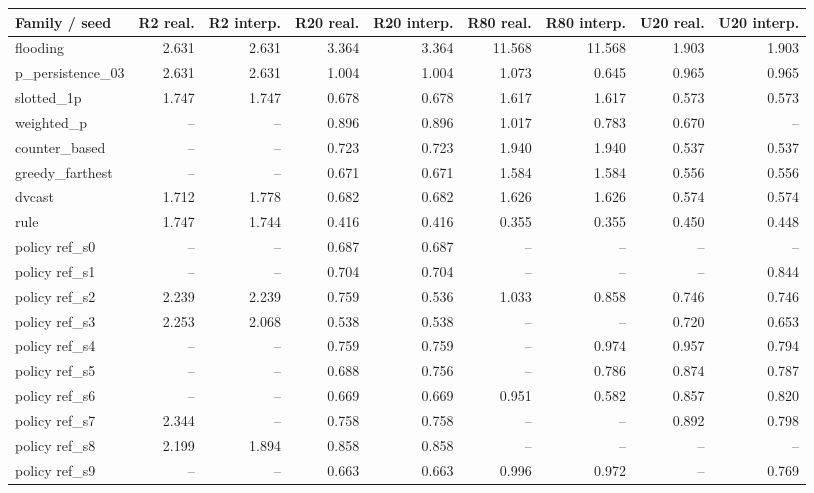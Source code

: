 \begin{tabular}{lrrrrrrrr}
\hline
Family / seed & R2 real. & R2 interp. & R20 real. & R20 interp. & R80 real. & R80 interp. & U20 real. & U20 interp. \\
\hline
flooding & 2.631 & 2.631 & 3.364 & 3.364 & 11.568 & 11.568 & 1.903 & 1.903 \\
p\_persistence\_03 & 2.631 & 2.631 & 1.004 & 1.004 & 1.073 & 0.645 & 0.965 & 0.965 \\
slotted\_1p & 1.747 & 1.747 & 0.678 & 0.678 & 1.617 & 1.617 & 0.573 & 0.573 \\
weighted\_p & -- & -- & 0.896 & 0.896 & 1.017 & 0.783 & 0.670 & -- \\
counter\_based & -- & -- & 0.723 & 0.723 & 1.940 & 1.940 & 0.537 & 0.537 \\
greedy\_farthest & -- & -- & 0.671 & 0.671 & 1.584 & 1.584 & 0.556 & 0.556 \\
dvcast & 1.712 & 1.778 & 0.682 & 0.682 & 1.626 & 1.626 & 0.574 & 0.574 \\
rule & 1.747 & 1.744 & 0.416 & 0.416 & 0.355 & 0.355 & 0.450 & 0.448 \\
policy ref\_s0 & -- & -- & 0.687 & 0.687 & -- & -- & -- & -- \\
policy ref\_s1 & -- & -- & 0.704 & 0.704 & -- & -- & -- & 0.844 \\
policy ref\_s2 & 2.239 & 2.239 & 0.759 & 0.536 & 1.033 & 0.858 & 0.746 & 0.746 \\
policy ref\_s3 & 2.253 & 2.068 & 0.538 & 0.538 & -- & -- & 0.720 & 0.653 \\
policy ref\_s4 & -- & -- & 0.759 & 0.759 & -- & 0.974 & 0.957 & 0.794 \\
policy ref\_s5 & -- & -- & 0.688 & 0.756 & -- & 0.786 & 0.874 & 0.787 \\
policy ref\_s6 & -- & -- & 0.669 & 0.669 & 0.951 & 0.582 & 0.857 & 0.820 \\
policy ref\_s7 & 2.344 & -- & 0.758 & 0.758 & -- & -- & 0.892 & 0.798 \\
policy ref\_s8 & 2.199 & 1.894 & 0.858 & 0.858 & -- & -- & -- & -- \\
policy ref\_s9 & -- & -- & 0.663 & 0.663 & 0.996 & 0.972 & -- & 0.769 \\
\hline
\end{tabular}
